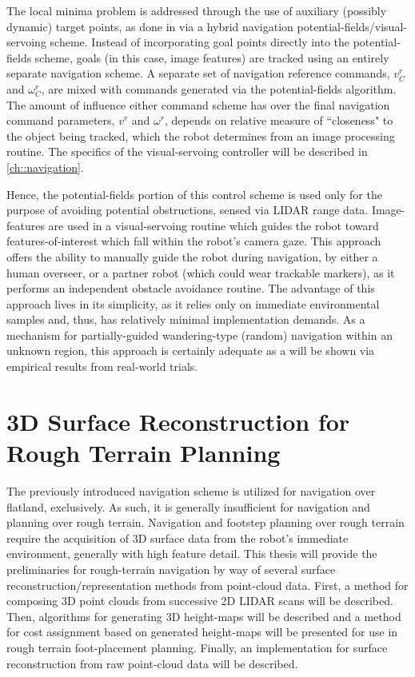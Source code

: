 		The local minima problem is addressed through the use of auxiliary (possibly dynamic) target points, as done in \cite{ArambulaCosio2004} via a hybrid navigation potential-fields/visual-servoing scheme. Instead of incorporating goal points directly into the potential-fields scheme, goals (in this case, image features) are tracked using an entirely separate navigation scheme. A separate set of navigation reference commands, $v^{r}_{C}$ and $\omega^{r}_{C}$, are mixed with commands generated via the potential-fields algorithm. The amount of influence either command scheme has over the final navigation command parameters, $v^{r}$ and $\omega^{r}$, depends on relative measure of ``closeness" to the object being tracked, which the robot determines from an image processing routine. The specifics of the visual-servoing controller will be described in \ref{ch::navigation}. 

		Hence, the potential-fields portion of this control scheme is used only for the purpose of avoiding potential obstructions, sensed via LIDAR range data. Image-features are used in a visual-servoing routine which guides the robot toward features-of-interest which fall within the robot’s camera gaze. This approach offers the ability to manually guide the robot during navigation, by either a human overseer, or a partner robot (which could wear trackable markers), as it performs an independent obstacle avoidance routine. The advantage of this approach lives in its simplicity, as it relies only on immediate environmental samples and, thus, has relatively minimal implementation demands.  As a mechanism for partially-guided wandering-type (random) navigation within an unknown region, this approach is certainly adequate as a will be shown via empirical results from real-world trials.




	\section{3D Surface Reconstruction for Rough Terrain Planning}

		The previously introduced navigation scheme is utilized for navigation over flatland, exclusively. As such, it is generally insufficient for navigation and planning over rough terrain. Navigation and footstep planning over rough terrain require the acquisition of 3D surface data from the robot’s immediate environment, generally with high feature detail. This thesis will provide the preliminaries for rough-terrain navigation by way of several surface reconstruction/representation methods from point-cloud data. First, a method for composing 3D point clouds from successive 2D LIDAR scans will be described. Then, algorithms for generating 3D height-maps will be described and a method for cost assignment based on generated height-maps will be presented for use in rough terrain foot-placement planning. Finally, an implementation for surface reconstruction from raw point-cloud data will be described.

